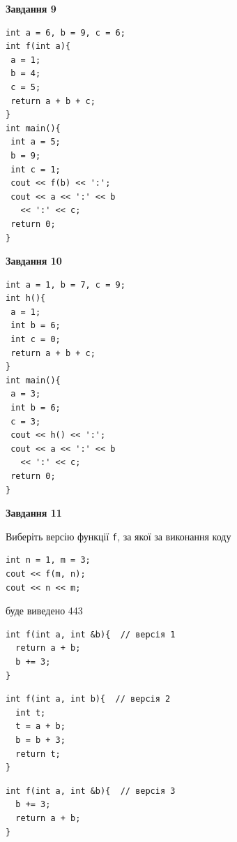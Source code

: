 \documentclass[12pt, ukrainian]{article}
\def\code#1{\Verb!#1!}
\begin{document}
{\begin {large}
\begin{minipage}[t]{11.0cm}
\end{minipage}


\begin{minipage}[t]{7.0cm}

\begin{center}
\textbf{Завдання 9}
\end{center}
\vspace{-8mm}

\begin{verbatim}
int a = 6, b = 9, c = 6;
int f(int a){
 a = 1;
 b = 4;
 c = 5;
 return a + b + c;
}
int main(){
 int a = 5;
 b = 9;
 int c = 1;
 cout << f(b) << ':';
 cout << a << ':' << b 
   << ':' << c;
 return 0;
}
\end{verbatim}



\begin{center}
\textbf{Завдання 10}
\end{center}
\vspace{-8mm}

\begin{verbatim}
int a = 1, b = 7, c = 9;
int h(){
 a = 1;
 int b = 6;
 int c = 0;
 return a + b + c;
}
int main(){
 a = 3;
 int b = 6;
 c = 3;
 cout << h() << ':';
 cout << a << ':' << b 
   << ':' << c;
 return 0;
}
\end{verbatim}

\end{minipage}
\vline \hspace{1mm}
\begin{minipage}[t]{11.0cm}

\begin{center}
\textbf{Завдання 11}
\end{center}
Виберіть версію функції \code{f}, за якої за виконання коду
\begin{verbatim}
int n = 1, m = 3;
cout << f(m, n);
cout << n << m;
\end{verbatim}

буде виведено 443

\begin{verbatim}
int f(int a, int &b){  // версія 1
  return a + b;
  b += 3;
}
\end{verbatim}

\vspace{-8mm}\begin{verbatim}
int f(int a, int b){  // версія 2
  int t;
  t = a + b;
  b = b + 3;
  return t;
}
\end{verbatim}

\vspace{-8mm}\begin{verbatim}
int f(int a, int &b){  // версія 3
  b += 3;
  return a + b;
}
\end{verbatim}


\end{minipage}
\end{large}}
\end{document}
